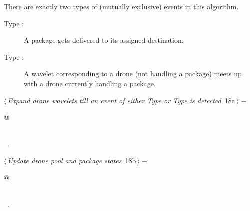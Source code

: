 \documentclass[10pt, english, oneside]{report}
\begin{document}
There are exactly two types of (mutually exclusive) events in this algorithm. 

\begin{description}
\item[Type :] A package gets delivered to its assigned destination. 
\item[Type :] A wavelet corresponding to a drone (not handling a package) meets up with 
   a drone currently handling a package. 
\end{description}

\begin{flushleft} \small
\begin{minipage}{\linewidth}\label{scrap18}\raggedright\small
{} $\langle\,${\itshape Expand drone wavelets till an event of either Type  or Type  is detected}\nobreak\ {\footnotesize {18a}}$\,\rangle\equiv$
\vspace{-1ex}
\begin{list}{}{} \item
\mbox{}\verb@   @\\
\mbox{}\verb@pass@\\
\mbox{}\verb@@{\NWsep}
\end{list}
\vspace{-1.5ex}
\footnotesize
\begin{list}{}{\setlength{\itemsep}{-\parsep}\setlength{\itemindent}{-\leftmargin}}
\item \NWtxtMacroRefIn\ .

\item{}
\end{list}
\end{minipage}\vspace{4ex}
\end{flushleft}

\begin{flushleft} \small
\begin{minipage}{\linewidth}\label{scrap19}\raggedright\small
{} $\langle\,${\itshape Update drone pool and package states}\nobreak\ {\footnotesize {18b}}$\,\rangle\equiv$
\vspace{-1ex}
\begin{list}{}{} \item
\mbox{}\verb@   @\\
\mbox{}\verb@pass@\\
\mbox{}\verb@@{\NWsep}
\end{list}
\vspace{-1.5ex}
\footnotesize
\begin{list}{}{\setlength{\itemsep}{-\parsep}\setlength{\itemindent}{-\leftmargin}}
\item \NWtxtMacroRefIn\ .

\item{}
\end{list}
\end{minipage}\vspace{4ex}
\end{flushleft}
\end{document}
